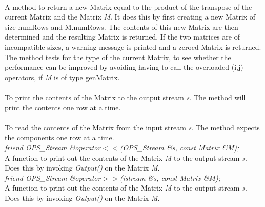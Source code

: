  \\ 
A method to return a new Matrix equal to the product of the transpose
of the current Matrix and the Matrix {\em M}. It does this by first
creating a new Matrix of size numRows and M.numRows. The contents of
this new Matrix are then determined and the resulting Matrix is
returned. If the two matrices are of incompatible sizes, a warning
message is printed and a zeroed Matrix is returned. The method tests
for the type of the current Matrix, to see whether the performance can
be improved by avoiding having to call the overloaded (i,j) operators,
if {\em M} is of type genMatrix. \\

 \\
To print the contents of the Matrix to the output stream {\em s}. The
method will print the contents one row at a time. \\ 

 \\
To read the contents of the Matrix from the input stream {\em s}. The method expects the components one row at a time. \\

{\em friend OPS_Stream \&operator$<<$(OPS_Stream \&s, const Matrix \&M);} \\
A function to print out the contents of the Matrix {\em M} to the
output stream {\em s}. Does this by invoking {\em Output()} on the
Matrix {\em M}.\\ 

{\em friend OPS_Stream \&operator$>>$(istream \&s, const Matrix \&M);} \\
A function to print out the contents of the Matrix {\em M} to the
output stream {\em s}. Does this by invoking {\em Output()} on the
Matrix {\em M}.\\ 

